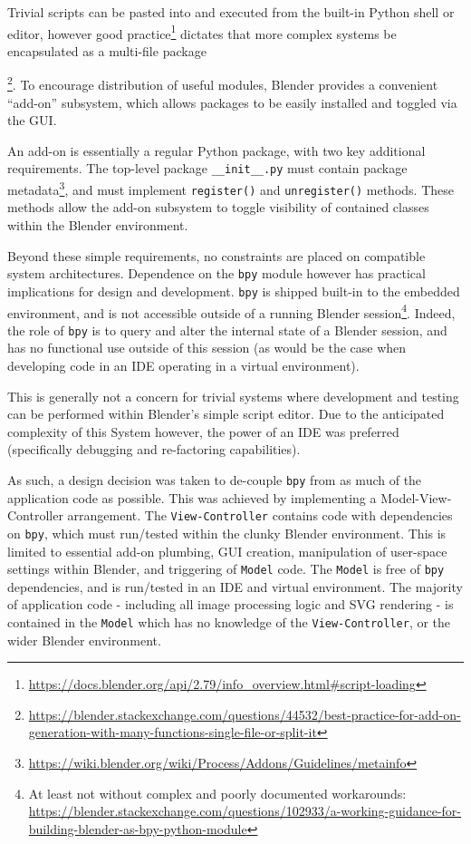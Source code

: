 Trivial scripts can be pasted into and executed from the built-in Python shell or editor, however good practice\footnote{\url{https://docs.blender.org/api/2.79/info_overview.html#script-loading}} dictates that more complex systems be encapsulated as a multi-file package{\footnote{\url{https://blender.stackexchange.com/questions/44532/best-practice-for-add-on-generation-with-many-functions-single-file-or-split-it}}.
To encourage distribution of useful modules, Blender provides a convenient ``add-on'' subsystem, which allows packages to be easily installed and toggled via the GUI.

An add-on is essentially a regular Python package, with two key additional requirements. 
The top-level package \texttt{\_\_init\_\_.py} must contain package metadata\footnote{\url{https://wiki.blender.org/wiki/Process/Addons/Guidelines/metainfo}}, and must implement \texttt{register()} and \texttt{unregister()} methods.
These methods allow the add-on subsystem to toggle visibility of contained classes within the Blender environment.

Beyond these simple requirements, no constraints are placed on compatible system architectures. 
Dependence on the \texttt{bpy} module however has practical implications for design and development.
\texttt{bpy} is shipped built-in to the embedded environment, and is not accessible outside of a running Blender session\footnote{At least not without complex and poorly documented workarounds: \url{https://blender.stackexchange.com/questions/102933/a-working-guidance-for-building-blender-as-bpy-python-module}}.
Indeed, the role of \texttt{bpy} is to query and alter the internal state of a Blender session, and has no functional use outside of this session (as would be the case when developing code in an IDE operating in a virtual environment).

This is generally not a concern for trivial systems where development and testing can be performed within Blender's simple script editor.
Due to the anticipated complexity of this System however, the power of an IDE was preferred (specifically debugging and re-factoring capabilities).

As such, a design decision was taken to de-couple \texttt{bpy} from as much of the application code as possible.
This was achieved by implementing a Model-View-Controller arrangement. 
The \texttt{View-Controller} contains code with dependencies on \texttt{bpy}, which must run/tested within the clunky Blender environment. 
This is limited to essential add-on plumbing, GUI creation, manipulation of user-space settings within Blender, and triggering of \texttt{Model} code. 
The \texttt{Model} is free of \texttt{bpy} dependencies, and is run/tested in an IDE and virtual environment. 
The majority of application code - including all image processing logic and SVG rendering - is contained in the \texttt{Model} which has no knowledge of the \texttt{View-Controller}, or the wider Blender environment.

}
